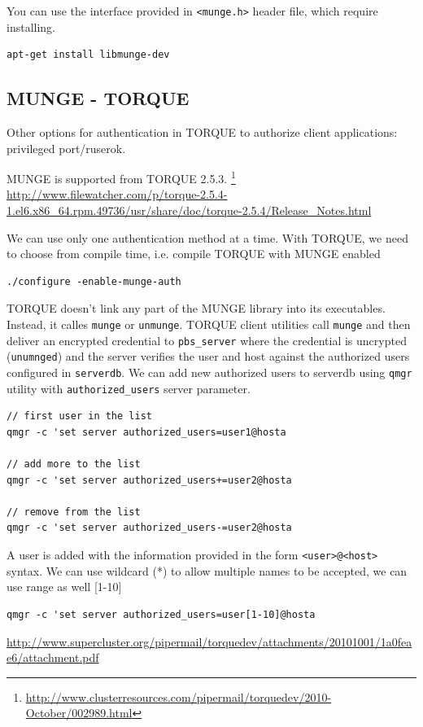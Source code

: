 You can use the interface provided in \verb!<munge.h>! header file, which
require installing.
\begin{verbatim}
apt-get install libmunge-dev 
\end{verbatim}

\subsection{MUNGE - TORQUE}
\label{sec:MUNGE_TORQUE}

Other options for authentication in TORQUE to authorize client applications:
privileged port/ruserok.

MUNGE is supported from TORQUE 2.5.3.
\footnote{\url{http://www.clusterresources.com/pipermail/torquedev/2010-October/002989.html}}
\url{http://www.filewatcher.com/p/torque-2.5.4-1.el6.x86_64.rpm.49736/usr/share/doc/torque-2.5.4/Release_Notes.html}

We can use only one authentication method at a time. With TORQUE, we need to
choose from compile time, i.e. compile TORQUE with MUNGE enabled
\begin{verbatim}
./configure -enable-munge-auth
\end{verbatim}

TORQUE doesn't link any part of the MUNGE library into its executables. Instead,
it calles \verb!munge! or \verb!unmunge!. TORQUE client utilities call
\verb!munge! and then deliver an encrypted credential to \verb!pbs_server!
where the credential is uncrypted (\verb!unumnged!) and the server verifies the
user and host against the authorized users configured in \verb!serverdb!. We can
add new authorized users to serverdb using \verb!qmgr! utility with
\verb!authorized_users! server parameter.
\begin{verbatim}
// first user in the list
qmgr -c 'set server authorized_users=user1@hosta

// add more to the list
qmgr -c 'set server authorized_users+=user2@hosta

// remove from the list
qmgr -c 'set server authorized_users-=user2@hosta
\end{verbatim}
A user is added with the information provided in the form \verb!<user>@<host>!
syntax. We can use wildcard (*) to allow multiple names to be accepted, we can
use range as well [1-10]
\begin{verbatim}
qmgr -c 'set server authorized_users=user[1-10]@hosta
\end{verbatim}
\url{http://www.supercluster.org/pipermail/torquedev/attachments/20101001/1a0feae6/attachment.pdf}

